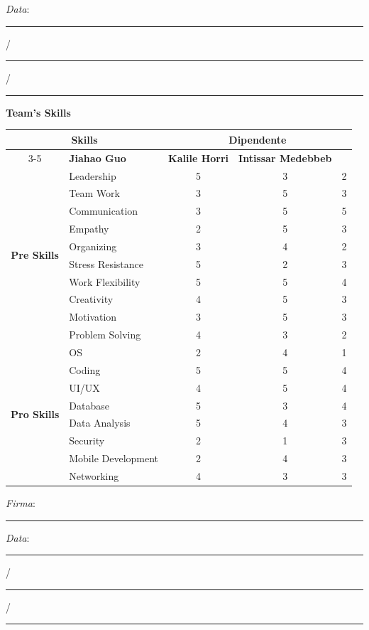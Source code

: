 \documentclass[12pt, a4paper]{article}
\begin{document}
\noindent \textit{Data}: \rule{1cm}{0.15mm} / \rule{1cm}{0.15mm} / \rule{1cm}{0.15mm}

\vspace{1em}
\noindent \textbf{\Large Team's Skills}
\vspace{1em}

\begin{table}[htbp]
\small
\centering
\begin{tabular}{|c|l|c|c|c|}
\hline
\multicolumn{2}{|c|}{\multirow{2}{*}{\textbf{Skills}}} & \multicolumn{3}{c|}{\textbf{Dipendente}} \\
\cline{3-5}
\multicolumn{2}{|c|}{} & \textbf{Jiahao Guo} & \textbf{Kalile Horri} & \textbf{Intissar Medebbeb} \\
\hline
\multirow{10}{*}{\textbf{Pre Skills}} 
& Leadership & 5 & 3 & 2\\ \cline{2-5}
& Team Work & 3 & 5 & 3\\ \cline{2-5}
& Communication & 3 & 5 & 5\\ \cline{2-5}
& Empathy & 2 & 5 & 3\\ \cline{2-5}
& Organizing & 3 & 4 & 2\\ \cline{2-5}
& Stress Resistance & 5 & 2 & 3\\ \cline{2-5}
& Work Flexibility & 5 & 5 & 4\\ \cline{2-5}
& Creativity & 4 & 5 & 3\\ \cline{2-5}
& Motivation & 3 & 5 & 3\\ \cline{2-5}
& Problem Solving & 4 & 3 & 2\\ 
\hline
\multirow{8}{*}{\textbf{Pro Skills}} 
& OS & 2 & 4 & 1\\ \cline{2-5}
& Coding & 5 & 5 & 4\\ \cline{2-5}
& UI/UX & 4 & 5 & 4\\ \cline{2-5}
& Database & 5 & 3 & 4\\ \cline{2-5}
& Data Analysis & 5 & 4 & 3\\ \cline{2-5}
& Security & 2 & 1 & 3\\ \cline{2-5}
& Mobile Development & 2 & 4 & 3\\ \cline{2-5}
& Networking & 4 & 3 & 3\\ 
\hline
\end{tabular}
\end{table}

\vspace{2em}
\noindent \textit{Firma}: \rule{5cm}{0.15mm}

\vspace{1em}
\noindent \textit{Data}: \rule{1cm}{0.15mm} / \rule{1cm}{0.15mm} / \rule{1cm}{0.15mm}
\end{document}
